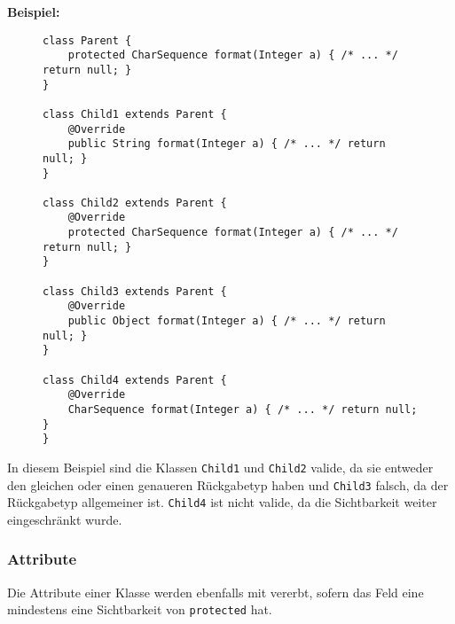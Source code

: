 		\textbf{Beispiel:}
		\begin{figure}[H]
			\centering
			\begin{lstlisting}
class Parent {
	protected CharSequence format(Integer a) { /* ... */ return null; }
}

class Child1 extends Parent {
	@Override
	public String format(Integer a) { /* ... */ return null; }
}

class Child2 extends Parent {
	@Override
	protected CharSequence format(Integer a) { /* ... */ return null; }
}

class Child3 extends Parent {
	@Override
	public Object format(Integer a) { /* ... */ return null; }
}

class Child4 extends Parent {
	@Override
	CharSequence format(Integer a) { /* ... */ return null; }
}
\end{lstlisting}
		\end{figure}
		In diesem Beispiel sind die Klassen \lstinline|Child1| und \lstinline|Child2| valide, da sie entweder den gleichen oder einen genaueren Rückgabetyp haben und \lstinline|Child3| falsch, da der Rückgabetyp allgemeiner ist. \lstinline|Child4| ist nicht valide, da die Sichtbarkeit weiter eingeschränkt wurde.
	
	\subsubsection{Attribute}
		Die Attribute einer Klasse werden ebenfalls mit vererbt, sofern das Feld eine mindestens eine Sichtbarkeit von \lstinline|protected| hat.
		
